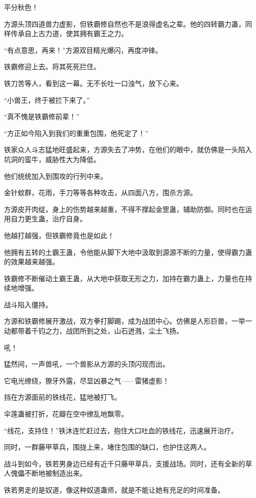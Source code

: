 \begin{this_body}
平分秋色！

方源头顶四道兽力虚影，但铁霸修自然也不是浪得虚名之辈。他的四转霸力蛊，同样传承自上古力道，使其拥有霸王之力。

“有点意思，再来！”方源双目精光爆闪，再度冲锋。

铁霸修迎上去。将其死死拦住。

铁刀苦等人，看到这一幕。无不长吐一口浊气，放下心来。

“小兽王，终于被拦下来了。”

“真不愧是铁霸修前辈！”

“方正如今陷入到我们的重重包围，他死定了！”

铁家众人斗志猛地旺盛起来，方源失去了冲势，在他们的眼中，就仿佛是一头陷入坑洞的蛮牛，威胁性大为降低。

他们统统加入到围攻的行列中来。

金针蚊群，花雨，手刀等等各种攻击，从四面八方，围杀方源。

方源皮开肉绽，身上的伤势越来越重，不得不撑起金罡蛊，辅助防御。同时也在运用自力更生蛊，治疗自身。

他越打越强，但铁霸修竟也是如此！

他拥有五转的土霸王蛊，令他能从脚下大地中汲取到源源不断的力量，使得霸力蛊的效果越来越强。

铁霸修不断催动土霸王蛊，从大地中获取无形之力，加持在霸力蛊上，力量也在持续地增强。

战斗陷入僵持。

方源和铁霸修展开激战，双方拳打脚踢，成为战团中心。仿佛是人形巨兽，一举一动都带着千钧之力，战团所到之处，山石迸溅，尘土飞扬。

吼！

猛然间，一声兽吼，一个兽影从方源的头顶闪现而出。

它电光缭绕，獠牙外露，尽显凶暴之气——雷猪虚影！

挡在方源面前的铁线花，猛地被打飞。

伞莲蛊被打折，花瓣在空中缭乱地飘零。

“线花，支持住！”铁沐连忙赶过去，抱住大口吐血的铁线花，迅速展开治疗。

同时，一群藤甲草兵，围拢上来，堵住包围的缺口，也护住这两人。

战斗到如今，铁若男身边已经有近千只藤甲草兵，支援战场。同时，还有全新的草人傀儡不断地被制造出来。

铁若男走的是奴道，像这种奴道蛊师，就是不能让她有充足的时间准备。


\end{this_body}
